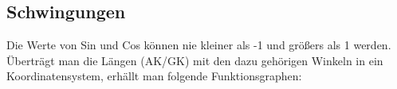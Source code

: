 \newpage
\subsection{Schwingungen}

\hfill \break
Die Werte von Sin und Cos können nie kleiner als -1 und größers als 1 werden.\\
Überträgt man die Längen (AK/GK) mit den dazu gehörigen Winkeln in ein Koordinatensystem, erhällt man folgende Funktionsgraphen:


\hfill \break

\break

\break
